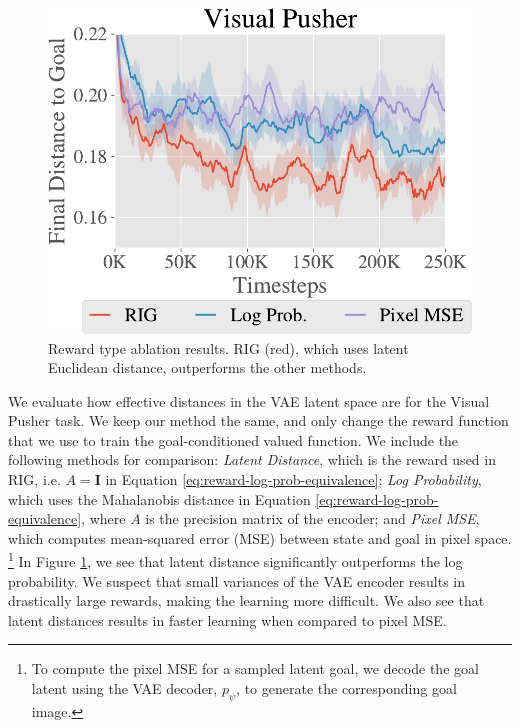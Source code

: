 \begin{figure}
    \centering
    \vspace{-0.2in}
    \includegraphics[width=\linewidth]{rig/img/pusher_reward_type_ablation_main.pdf}
    \vspace{-0.2in}
    \captionsetup{format=plain, justification=justified}
    \caption{Reward type ablation results. RIG (red), which uses latent Euclidean distance, outperforms the other methods.}
    \vspace{-0.1in}
    \label{fig:reward-ablation}
\end{figure}
We evaluate how effective distances in the VAE latent space are for the Visual Pusher task.
We keep our method the same, and only change the reward function that we use to train the goal-conditioned valued function.
We include the following methods for comparison:
\textit{Latent Distance}, which is the reward used in RIG, i.e. $A = \mathbf{I}$ in Equation \eqref{eq:reward-log-prob-equivalence};
\textit{Log Probability}, which uses the Mahalanobis distance in Equation \eqref{eq:reward-log-prob-equivalence}, where $A$ is the precision matrix of the encoder;
and \textit{Pixel MSE}, which computes mean-squared error (MSE) between state and goal in pixel space.
\footnote{To compute the pixel MSE for a sampled latent goal, we decode the goal latent using the VAE decoder, $p_\psi$, to generate the corresponding goal image.}
In Figure \ref{fig:reward-ablation}, we see that latent distance significantly outperforms the log probability.
We suspect that small variances of the VAE encoder results in drastically large rewards, making the learning more difficult.
We also see that latent distances results in faster learning when compared to pixel MSE.

